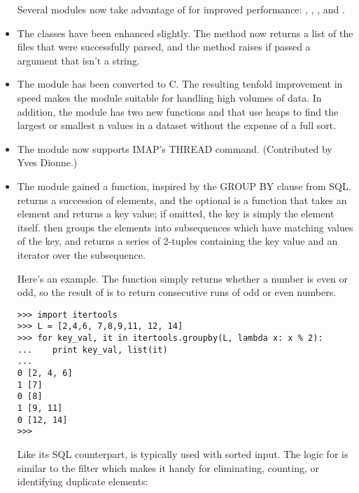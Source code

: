 \documentclass{howto}
\begin{document}
\begin{itemize}
Several modules now take advantage of  for
improved performance:  , , 
, and .

\item The  classes have been enhanced slightly.
   The  method now returns a list of the files that
   were successfully parsed, and the  method raises
    if passed a  argument that isn't a
   string.

\item The  module has been converted to C.  The resulting
   tenfold improvement in speed makes the module suitable for handling
   high volumes of data.  In addition, the module has two new functions
    and  that use heaps to
   find the largest or smallest n values in a dataset without the
   expense of a full sort.

\item The  module now supports IMAP's THREAD command.
(Contributed by Yves Dionne.)

\item The  module gained a
   function,
  inspired by the GROUP BY clause from SQL.
   returns a succession of elements, and the optional
   is a function that takes an element and returns a key
  value; if omitted, the key is simply the element itself.
   then groups the elements into subsequences
  which have matching values of the key, and returns a series of 2-tuples
  containing the key value and an iterator over the subsequence.
 
Here's an example.  The  function simply returns whether a
number is even or odd, so the result of  is to
return consecutive runs of odd or even numbers.

\begin{verbatim}
>>> import itertools
>>> L = [2,4,6, 7,8,9,11, 12, 14]
>>> for key_val, it in itertools.groupby(L, lambda x: x % 2):
...    print key_val, list(it)
... 
0 [2, 4, 6]
1 [7]
0 [8]
1 [9, 11]
0 [12, 14]
>>> 
\end{verbatim}

Like its SQL counterpart,  is typically used with
sorted input.  The logic for  is similar to the
\UNIX{}  filter which makes it handy for eliminating,
counting, or identifying duplicate elements:


\end{itemize}
\end{document}
